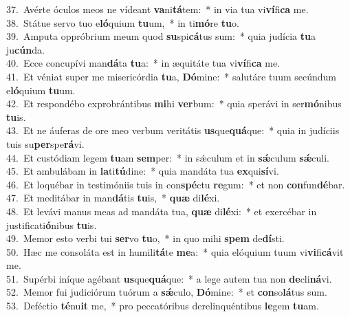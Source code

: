 {37.~}Avérte óculos meos ne vídeant \textbf{va}ni\textbf{tá}tem:~* in via tua vi\textbf{ví}fi\textbf{ca} me.\\
{38.~}Státue servo tuo e\textbf{ló}quium \textbf{tu}um,~* in ti\textbf{mó}re \textbf{tu}o.\\
{39.~}Amputa oppróbrium meum quod \textbf{su}spi\textbf{cá}tus sum:~* quia judícia \textbf{tu}a ju\textbf{cún}da.\\
{40.~}Ecce concupívi man\textbf{dá}ta \textbf{tu}a:~* in æquitáte tua vi\textbf{ví}fi\textbf{ca} me.\\
{41.~}Et véniat super me misericórdia \textbf{tu}a, \textbf{Dó}mine:~* salutáre tuum secúndum e\textbf{ló}quium \textbf{tu}um.\\
{42.~}Et respondébo exprobrántibus \textbf{mi}hi \textbf{ver}bum:~* quia sperávi in ser\textbf{mó}nibus \textbf{tu}is.\\
{43.~}Et ne áuferas de ore meo verbum veritátis \textbf{us}que\textbf{quá}que:~* quia in judíciis tuis su\textbf{per}spe\textbf{rá}vi.\\
{44.~}Et custódiam legem \textbf{tu}am \textbf{sem}per:~* in sǽculum et in \textbf{sǽ}culum \textbf{sǽ}culi.\\
{45.~}Et ambulábam in \textbf{la}ti\textbf{tú}dine:~* quia mandáta tua \textbf{ex}qui\textbf{sí}vi.\\
{46.~}Et loquébar in testimóniis tuis in con\textbf{spé}ctu \textbf{re}gum:~* et non \textbf{con}fun\textbf{dé}bar.\\
{47.~}Et meditábar in man\textbf{dá}tis \textbf{tu}is,~* \textbf{quæ} di\textbf{lé}xi.\\
{48.~}Et levávi manus meas ad mandáta tua, \textbf{quæ} di\textbf{lé}xi:~* et exercébar in justificati\textbf{ó}nibus \textbf{tu}is.\\
{49.~}Memor esto verbi tui \textbf{ser}vo \textbf{tu}o,~* in quo mihi \textbf{spem} de\textbf{dí}sti.\\
{50.~}Hæc me consoláta est in humili\textbf{tá}te \textbf{me}a:~* quia elóquium tuum vi\textbf{vi}fi\textbf{cá}vit me.\\
{51.~}Supérbi iníque agébant \textbf{us}que\textbf{quá}que:~* a lege autem tua non \textbf{de}cli\textbf{ná}vi.\\
{52.~}Memor fui judiciórum tuórum a \textbf{sǽ}culo, \textbf{Dó}mine:~* et \textbf{con}so\textbf{lá}tus sum.\\
{53.~}Deféctio \textbf{té}nu\textbf{it} me,~* pro peccatóribus derelinquéntibus \textbf{le}gem \textbf{tu}am.\\
